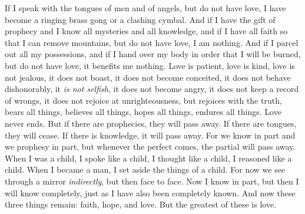 \begin{biblechapter} %
 If I speak with the tongues of men and of angels, but do not have love, I have become a ringing brass gong or a clashing cymbal.
\verse And if I have the gift of prophecy and I know all mysteries and all knowledge, and if I have all faith so that I can remove mountains, but do not have love, I am nothing.
\verse And if I parcel out all my possessions, and if I hand over my body in order that I will be burned, but do not have love, it benefits me nothing.
\verse Love is patient, love is kind, love is not jealous, it does not boast, it does not become conceited,
\verse it does not behave dishonorably, it \textit{is not selfish}, it does not become angry, it does not keep a record of wrongs,
\verse it does not rejoice at unrighteousness, but rejoices with the truth,
\verse bears all things, believes all things, hopes all things, endures all things.
\verse Love never ends. But if there are prophecies, they will pass away. If there are tongues, they will cease. If there is knowledge, it will pass away.
\verse For we know in part and we prophesy in part,
\verse but whenever the perfect comes, the partial will pass away.
\verse When I was a child, I spoke like a child, I thought like a child, I reasoned like a child. When I became a man, I set aside the things of a child.
\verse For now we see through a mirror \textit{indirectly}, but then face to face. Now I know in part, but then I will know completely, just as I have also been completely known.
\verse And now these three things remain: faith, hope, and love. But the greatest of these is love.
\end{biblechapter}

